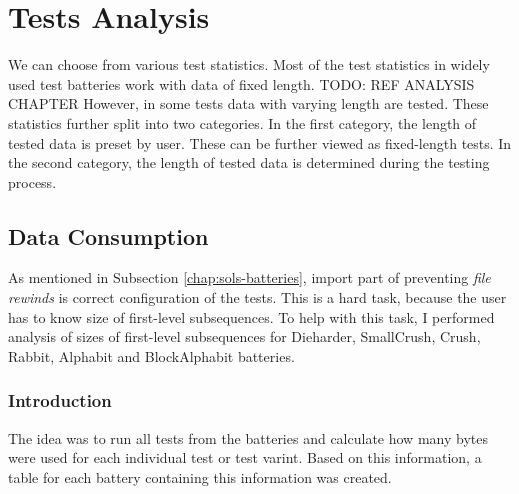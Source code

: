 \documentclass[
  digital,     %
  oneside,     %
  nosansbold,  %
  nocolorbold, %
  nolof,         %
  nolot,         %
]{fithesis4}
\begin{document}




\chapter{Tests Analysis} 
We can choose from various test statistics. Most of the test statistics in widely used test batteries work with data of fixed length. TODO: REF ANALYSIS CHAPTER However, in some tests data with varying length are tested. These statistics further split into two categories. In the first category, the length of tested data is preset by user. These can be further viewed as fixed-length tests. In the second category, the length of tested data is determined during the testing process.

\section{Data Consumption} \label{chap:analysis-data}


As mentioned in Subsection \ref{chap:sols-batteries}, import part of preventing \emph{file rewinds} is correct configuration of the tests. This is a hard task, because the user has to know size of first-level subsequences. To help with this task, I performed analysis of sizes of first-level subsequences for Dieharder, SmallCrush, Crush, Rabbit, Alphabit and BlockAlphabit batteries.  %

\subsection{Introduction} \label{chap:analysis-data-intro}

The idea was to run all tests from the batteries and calculate how many bytes were used for each individual test or test varint. Based on this information, a table for each battery containing this information was created.
\end{document}
